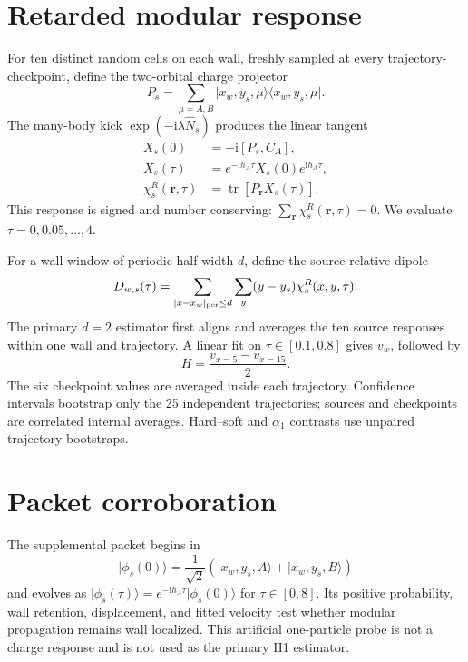 \documentclass[aps,prresearch,twocolumn,superscriptaddress,nofootinbib]{revtex4-2}
\newcommand{\ii}{\mathrm{i}}
\newcommand{\tr}{\operatorname{tr}}
\begin{document}
\section{Retarded modular response}

For ten distinct random cells on each wall, freshly sampled at every
trajectory-checkpoint, define the two-orbital charge projector
\begin{equation}
 P_s=\sum_{\mu=A,B}\lvert x_w,y_s,\mu\rangle
 \langle x_w,y_s,\mu\rvert.
\end{equation}
The many-body kick $\exp(-\ii\lambda\hat N_s)$ produces the linear tangent
\begin{align}
 X_s(0)&=-\ii[P_s,C_A],\\
 X_s(\tau)&=e^{-\ii h_A\tau}X_s(0)e^{\ii h_A\tau},\\
 \chi_s^R(\boldsymbol r,\tau)&=\tr[P_{\boldsymbol r}X_s(\tau)].
\end{align}
This response is signed and number conserving:
$\sum_{\boldsymbol r}\chi_s^R(\boldsymbol r,\tau)=0$.
We evaluate $\tau=0,0.05,\ldots,4$.

For a wall window of periodic half-width $d$, define the source-relative dipole
\begin{equation}
 D_{w,s}(\tau)=\sum_{|x-x_w|_{\rm per}\le d}\sum_y
 (y-y_s)\chi_s^R(x,y,\tau).
\end{equation}
The primary $d=2$ estimator first aligns and averages the ten source responses within
one wall and trajectory. A linear fit on $\tau\in[0.1,0.8]$ gives $v_w$, followed by
\begin{equation}
 H=\frac{v_{x=5}-v_{x=15}}{2}.
\end{equation}
The six checkpoint values are averaged inside each trajectory. Confidence intervals
bootstrap only the 25 independent trajectories; sources and checkpoints are correlated
internal averages. Hard--soft and $\alpha_1$ contrasts use unpaired trajectory
bootstraps.

\section{Packet corroboration}

The supplemental packet begins in
\begin{equation}
 \lvert\phi_s(0)\rangle=\frac{1}{\sqrt2}
 \left(\lvert x_w,y_s,A\rangle+\lvert x_w,y_s,B\rangle\right)
\end{equation}
and evolves as $\lvert\phi_s(\tau)\rangle=e^{-\ii h_A\tau}\lvert\phi_s(0)\rangle$
for $\tau\in[0,8]$. Its positive probability, wall retention, displacement, and fitted
velocity test whether modular propagation remains wall localized. This artificial
one-particle probe is not a charge response and is not used as the primary H1 estimator.
\end{document}
